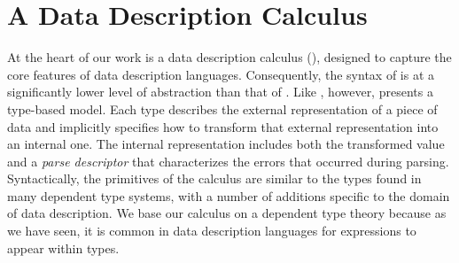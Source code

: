 \section{A Data Description Calculus}
\label{sec:ddc}

At the heart of our work is a data description calculus (\ddc{}),
designed to capture the core features of data description languages.
Consequently, the syntax of \ddc{} is at a significantly lower level
of abstraction than that of \ipads{}.  Like \ipads{}, however, \ddc{}
presents a type-based model.  Each \ddc{} type describes the external
representation of a piece of data and implicitly specifies how to
transform that external representation into an internal one.  The
internal representation includes both the transformed value and a
\textit{parse descriptor} that characterizes the errors that occurred
during parsing. Syntactically, the primitives of the calculus are
similar to the types found in many dependent type systems, with a
number of additions specific to the domain of data description.
We base our calculus on a dependent type theory because as we have seen,
it is common in data description languages for expressions to appear within
types.


